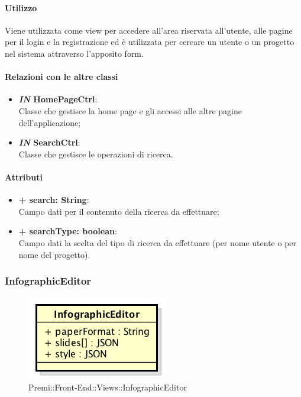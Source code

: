 	\paragraph{Utilizzo}
	Viene utilizzata come view per accedere all'area riservata all'utente, alle pagine per il login e la registrazione ed è utilizzata per cercare un utente o un progetto nel sistema attraverso l'apposito form.
	
	\paragraph{Relazioni con le altre classi}
	\begin{itemize}
		\item \textbf{\textit{IN} HomePageCtrl}:\\
			Classe che gestisce la home page e gli accessi alle altre pagine dell'applicazione;
		\item \textbf{\textit{IN} SearchCtrl}:\\
			Classe che gestisce le operazioni di ricerca.
	\end{itemize}
	
	\paragraph{Attributi}
	\begin{itemize}
		\item \textbf{+ search: String}:\\
			Campo dati per il contenuto della ricerca da effettuare;
		\item \textbf{+ searchType: boolean}:\\
			Campo dati la scelta del tipo di ricerca da effettuare (per nome utente o per nome del progetto).
	\end{itemize}
\newpage
	
	
\subsubsection{InfographicEditor}
	\begin{figure}[h]
		\centering
		\includegraphics[width=0.3\linewidth]{img/premi_front_end_views_infographiceditor}
		\caption[Premi::Front-End::Views::InfographicEditor]{Premi::Front-End::Views::InfographicEditor}
	\end{figure}
	
